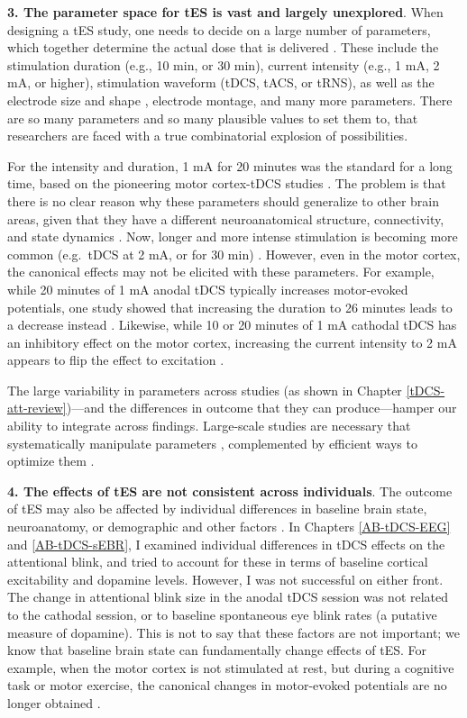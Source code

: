 \documentclass[11pt,]{memoir}
\begin{document}
\textbf{3. The parameter space for tES is vast and largely unexplored}. When designing a tES study, one needs to decide on a large number of parameters, which together determine the actual dose that is delivered \autocite{Peterchev2012}. These include the stimulation duration (e.g., 10 min, or 30 min), current intensity (e.g., 1 mA, 2 mA, or higher), stimulation waveform (tDCS, tACS, or tRNS), as well as the electrode size and shape \autocite{Saturnino2015}, electrode montage, and many more parameters. There are so many parameters and so many plausible values to set them to, that researchers are faced with a true combinatorial explosion of possibilities.

For the intensity and duration, 1 mA for 20 minutes was the standard for a long time, based on the pioneering motor cortex-tDCS studies \autocites{Nitsche2000}{Nitsche2001}. The problem is that there is no clear reason why these parameters should generalize to other brain areas, given that they have a different neuroanatomical structure, connectivity, and state dynamics \autocite{Bestmann2017}. Now, longer and more intense stimulation is becoming more common (e.g.~tDCS at 2 mA, or for 30 min) \autocites{Bikson2016}{Grossman2018}. However, even in the motor cortex, the canonical effects may not be elicited with these parameters. For example, while 20 minutes of 1 mA anodal tDCS typically increases motor-evoked potentials, one study showed that increasing the duration to 26 minutes leads to a decrease instead \autocite{Monte-Silva2013}. Likewise, while 10 or 20 minutes of 1 mA cathodal tDCS has an inhibitory effect on the motor cortex, increasing the current intensity to 2 mA appears to flip the effect to excitation \autocites{Batsikadze2013}{Parkin2018}{Samani2019}.

The large variability in parameters across studies (as shown in Chapter \ref{tDCS-att-review})---and the differences in outcome that they can produce---hamper our ability to integrate across findings. Large-scale studies are necessary that systematically manipulate parameters \autocite[e.g.][]{Samani2019}, complemented by efficient ways to optimize them \autocite[e.g.][]{Violante2019}.

\textbf{4. The effects of tES are not consistent across individuals}. The outcome of tES may also be affected by individual differences in baseline brain state, neuroanatomy, or demographic and other factors \autocite{Polania2018}. In Chapters \ref{AB-tDCS-EEG} and \ref{AB-tDCS-sEBR}, I examined individual differences in tDCS effects on the attentional blink, and tried to account for these in terms of baseline cortical excitability and dopamine levels. However, I was not successful on either front. The change in attentional blink size in the anodal tDCS session was not related to the cathodal session, or to baseline spontaneous eye blink rates (a putative measure of dopamine). This is not to say that these factors are not important; we know that baseline brain state can fundamentally change effects of tES. For example, when the motor cortex is not stimulated at rest, but during a cognitive task or motor exercise, the canonical changes in motor-evoked potentials are no longer obtained \autocite{Antal2007}.
\end{document}
